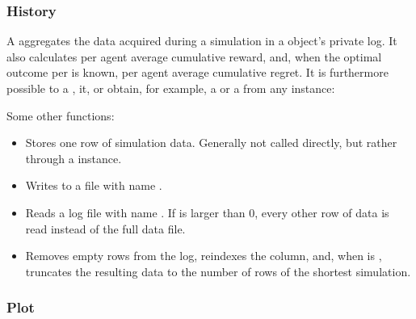 \documentclass{jss}
\begin{document}
\subsubsection{History}

A  aggregates the data acquired during a simulation in a  object's private  log. It also calculates per agent average cumulative reward, and, when the optimal outcome per  is known, per agent average cumulative regret. It is furthermore possible to  a ,  it, or obtain, for example, a  or a  from any  instance:


Some other  functions:

\begin{itemize}
 \item{}{
    Stores one row of simulation data. Generally not called directly,
    but rather through a  instance.
 }
 \item{}{
    Writes  to a file with name .
 }
 \item{}{
    Reads a  log file with name .
    If  is larger than 0, every other  row of data is read instead of the
    full data file.
 }
 \item{}{
    Removes empty rows from the  log, reindexes the  column, and,
    when  is , truncates the resulting data to the number of rows of the shortest
    simulation.
 }
\end{itemize}

\subsubsection{Plot}
\end{document}
